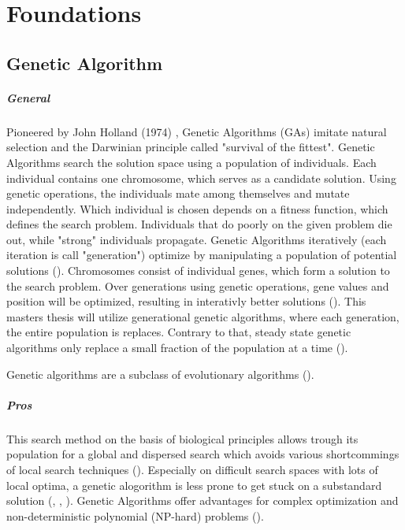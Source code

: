 \chapter{Foundations}
\label{chap:foundation}

\section{Genetic Algorithm}
\label{chap:foundation:genetic_algorithm}






\paragraph{General}
Pioneered by John Holland (1974) , Genetic Algorithms (GAs) imitate natural selection and the Darwinian principle called "survival of the fittest". Genetic Algorithms search the solution space using a population of individuals. Each individual contains one chromosome, which serves as a candidate solution. Using genetic operations, the individuals mate among themselves and mutate independently. Which individual is chosen depends on a fitness function, which defines the search problem. Individuals that do poorly on the given problem die out, while "strong" individuals propagate.
Genetic Algorithms iteratively (each iteration is call "generation") optimize by manipulating a population of potential solutions (\cite{srinivas_genetic_1994}).
Chromosomes consist of individual genes, which form a solution to the search problem. Over generations using genetic operations, gene values and position will be optimized, resulting in interativly better solutions (\cite{srinivas_genetic_1994}).
This masters thesis will utilize generational genetic algorithms, where each generation, the entire population is replaces. Contrary to that, steady state genetic algorithms only replace a small fraction of the population at a time (\cite{srinivas_genetic_1994}).

Genetic algorithms are a subclass of evolutionary algorithms (\cite{mills_determining_2015}).


\paragraph{Pros}
This search method on the basis of biological principles allows trough its population for a global and dispersed search which avoids various shortcommings of local search techniques (\cite{grefenstette_optimization_1986}). Especially on difficult search spaces with lots of local optima, a genetic alogorithm is less prone to get stuck on a substandard solution (\cite{katoch_review_2021}, \cite{xia_genetic_2019}, \cite{majumdar_genetic_2015}). Genetic Algorithms offer advantages for complex optimization and non-deterministic polynomial (NP-hard) problems (\cite{hussain_trade-off_2020}).

